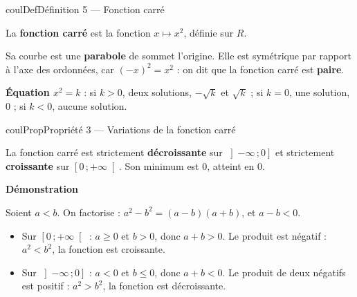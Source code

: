 \documentclass[11pt,a4paper]{article}
\makeatletter
\newcommand{\R}{\mathbb{R}}
\newcommand{\N}{\mathbb{N}}
\newcommand{\Z}{\mathbb{Z}}
\newcommand{\Q}{\mathbb{Q}}
\renewcommand{\le}{\leqslant}
\renewcommand{\ge}{\geqslant}
\newcommand{\vect}[1]{\overrightarrow{#1}}
\newcommand{\fois}[1]{\times{\color{coulExo}#1}}
\newcommand{\lycee@repere}[4]{%
  \draw[grille,step=1] (#1,#2) grid (#3,#4);
  \draw[-{Stealth[length=2mm]},thick] (#1,0)--({#3+0.4},0) node[below left=-1pt]{$x$};
  \draw[-{Stealth[length=2mm]},thick] (0,#2)--(0,{#4+0.4}) node[below left=-1pt]{$y$};
  \node[below left,font=\scriptsize,inner sep=1.5pt] at (0,0) {$0$};}
\newcommand{\lycee@gradx}[1]{\foreach \k/\l in {#1}{%
  \draw (\k,0.07)--(\k,-0.07) node[below,font=\scriptsize,inner sep=1.5pt]{$\l$};}}
\newcommand{\lycee@grady}[1]{\foreach \k/\l in {#1}{%
  \draw (0.07,\k)--(-0.07,\k) node[left,font=\scriptsize,inner sep=1.5pt]{$\l$};}}
\newcommand{\lycee@intfo}[2]{\left[#1\,;#2\right[}
\newcommand{\lycee@intof}[2]{\left]#1\,;#2\right]}
\providecommand{\repere}{\lycee@repere}%
\providecommand{\gradx}{\lycee@gradx}%
\providecommand{\grady}{\lycee@grady}%
\providecommand{\Cf}{\mathcal{C}\sb{f}}%
\providecommand{\Cg}{\mathcal{C}\sb{g}}%
\providecommand{\intfo}{\lycee@intfo}%
\providecommand{\intof}{\lycee@intof}%
\newcounter{lycee@signet}
\newcommand{\signet}[3][]{\stepcounter{lycee@signet}%
  \edef\lycee@dest{\if\relax\detokenize{#1}\relax
    signet.\arabic{lycee@signet}\else#1\fi}%
  \hypertarget{\lycee@dest}{}\bookmark[level=#2,dest=\lycee@dest]{#3}}
\def\R{R}\def\N{N}\def\Z{Z}\def\Q{Q}\def\vect#1{#1}\def\Cf{Cf}\def\Cg{Cg}\def\fois#1{×#1}%
\newenvironment{definitionbox}[1][Définition]%
  {\begin{boitecours}[phantom={\signet{2}{#1}}]{coulDef}{#1}}{\end{boitecours}}
\newenvironment{proprietebox}[1][Propriété]%
  {\begin{boitecours}[phantom={\signet{2}{#1}}]{coulProp}{#1}}{\end{boitecours}}
\newenvironment{correction}{\par}{\par}
\newcommand{\autableau}{}
\makeatother
\begin{document}
\begin{definitionbox}[Définition 5 --- Fonction carré]
\begin{minipage}[t]{0.58\linewidth}\raggedright
\vspace{0pt}
La \textbf{fonction carré} est la fonction $x\longmapsto x^{2}$, définie sur $\R$.

\smallskip
Sa courbe est une \textbf{parabole} de sommet l'origine. Elle est symétrique par
rapport à l'axe des ordonnées, car $(-x)^{2}=x^{2}$ : on dit que la fonction carré est
\textbf{paire}.

\smallskip
\textbf{Équation $x^{2}=k$} : si $k>0$, deux solutions, $-\sqrt{k}$ et $\sqrt{k}$ ; si
$k=0$, une solution, $0$ ; si $k<0$, aucune solution.
\end{minipage}\hfill
\begin{minipage}[t]{0.38\linewidth}\centering
\vspace{0pt}
\end{minipage}
\end{definitionbox}

\begin{proprietebox}[Propriété 3 --- Variations de la fonction carré]
\begin{minipage}[t]{0.50\linewidth}\raggedright
\vspace{0pt}
La fonction carré est strictement \textbf{décroissante} sur $\intof{-\infty}{0}$ et
strictement \textbf{croissante} sur $\intfo{0}{+\infty}$. Son minimum est $0$, atteint
en $0$.
\end{minipage}\hfill
\begin{minipage}[t]{0.46\linewidth}\centering
\vspace{0pt}
\end{minipage}

\smallskip
\textbf{Démonstration}\autableau
\begin{correction}
Soient $a<b$. On factorise : $a^{2}-b^{2}=(a-b)(a+b)$, et $a-b<0$.
\begin{itemize}
  \item Sur $\intfo{0}{+\infty}$ : $a\ge 0$ et $b>0$, donc $a+b>0$. Le produit est
        négatif : $a^{2}<b^{2}$, la fonction est croissante.
  \item Sur $\intof{-\infty}{0}$ : $a<0$ et $b\le 0$, donc $a+b<0$. Le produit de deux
        négatifs est positif : $a^{2}>b^{2}$, la fonction est décroissante.
\end{itemize}
\end{correction}
\end{proprietebox}
\end{document}
